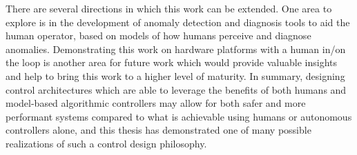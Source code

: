 There are several directions in which this work can be extended. One area to explore is in the development of anomaly detection and diagnosis tools to aid the human operator, based on models of how humans perceive and diagnose anomalies. Demonstrating this work on hardware platforms with a human in/on the loop is another area for future work which would provide valuable insights and help to bring this work to a higher level of maturity. In summary, designing control architectures which are able to leverage the benefits of both humans and model-based algorithmic controllers may allow for both safer and more performant systems compared to what is achievable using humans or autonomous controllers alone, and this thesis has demonstrated one of many possible realizations of such a control design philosophy.
